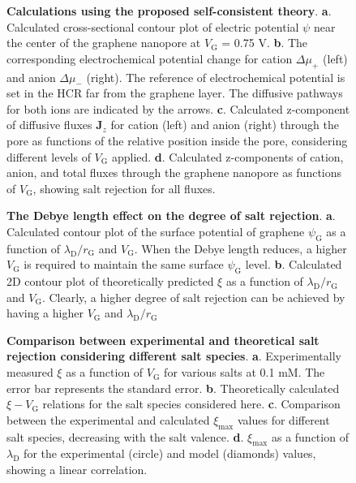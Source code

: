 \begin{figure}[H]
  \centering
  \caption{\textbf{Calculations using the proposed self-consistent
      theory}. \textbf{a}. Calculated cross-sectional contour plot of
    electric potential $\psi$ near the center of the graphene
    nanopore at $V_{\mathrm{G}}$ = 0.75 V. \textbf{b}. The
    corresponding electrochemical potential change for cation
    $\Delta \mu_{+}$ (left) and anion $\Delta \mu_{-}$ (right). The
    reference of electrochemical potential is set in the HCR far from
    the graphene layer. The diffusive pathways for both ions are
    indicated by the arrows. \textbf{c}. Calculated z-component of
    diffusive fluxes $\boldsymbol{J}_{z}$ for cation (left) and anion
    (right) through the pore as functions of the relative position
    inside the pore, considering different levels of $V_{\mathrm{G}}$
    applied. \textbf{d}. Calculated z-components of cation, anion, and
    total fluxes through the graphene nanopore as functions of
    $V_{\mathrm{G}}$, showing salt rejection for all fluxes.}
  \label{fig:np-4}
\end{figure}

\begin{figure}[H]
  \centering
  \caption{\textbf{The Debye length effect on the degree of salt
      rejection}. \textbf{a}. Calculated contour plot of the surface
    potential of graphene $\psi_{\mathrm{G}}$ as a function of
    $\lambda_{\mathrm{D}}/r_{\mathrm{G}}$ and $V_{\mathrm{G}}$. When
    the Debye length reduces, a higher $V_{\mathrm{G}}$ is required to
    maintain the same surface $\psi_{\mathrm{G}}$
    level. \textbf{b}. Calculated 2D contour plot of theoretically
    predicted $\xi$ as a function of
    $\lambda_{\mathrm{D}}/r_{\mathrm{G}}$ and
    $V_{\mathrm{G}}$. Clearly, a higher degree of salt rejection can
    be achieved by having a higher $V_{\mathrm{G}}$ and
    $\lambda_{\mathrm{D}}/r_{\mathrm{G}}$}
  \label{fig:np-5}
\end{figure}

\begin{figure}[H]
  \centering
  \caption{\textbf{Comparison between experimental and theoretical
      salt rejection considering different salt
      species}. \textbf{a}. Experimentally measured $\xi$ as a
    function of $V_{\mathrm{G}}$ for various salts at 0.1 mM. The
    error bar represents the standard error. \textbf{b}. Theoretically
    calculated $\xi-V_{\mathrm{G}}$ relations for the salt species
    considered here. \textbf{c}. Comparison between the experimental
    and calculated $\xi_{\mathrm{max}}$ values for different salt
    species, decreasing with the salt
    valence. \textbf{d}. $\xi_{\mathrm{max}}$ as a function of
    $\lambda_{\mathrm{D}}$ for the experimental (circle) and model
    (diamonds) values, showing a linear correlation.}
  \label{fig:np-6}
\end{figure}







